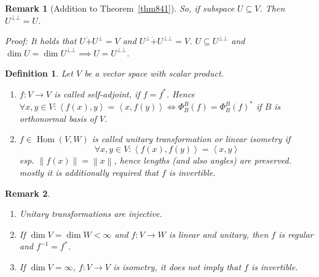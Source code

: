 \documentclass{article}
\newtheorem{definition}{Definition}  \numberwithin{definition}{section}
\newtheorem{remark}{Remark}  \numberwithin{remark}{section}
\newcommand{\ip}[2]{\left\langle#1,#2\right\rangle} %
\newcommand{\norm}[1]{\left\|#1\right\|}
\DeclareMathOperator{\Hom}{Hom}
\begin{document}
\begin{remark}[Addition to Theorem~\ref{thm841}]
  So, if subspace $U \subseteq V$. Then $U^{\bot\bot} = U$.

  Proof: It holds that $U \dot{+} U^\bot = V$ and $U^\bot \dot{+} U^{\bot\bot} = V$.
  $U \subseteq U^{\bot\bot}$ and $\dim{U} = \dim{U}^{\bot\bot} \implies U = U^{\bot\bot}$.
\end{remark}

\begin{definition} %
  Let $V$ be a vector space with scalar product.
  \begin{enumerate}
    \item $f: V \to V$ is called \emph{self-adjoint}, if $f = f^*$.
      Hence $\forall x, y \in V: \ip{f(x)}{y} = \ip{x}{f(y)} \iff \Phi_B^B(f) = \Phi_B^B(f)^*$
      if $B$ is orthonormal basis of $V$.
    \item
      $f \in \Hom(V,W)$ is called \emph{unitary transformation} or \emph{linear isometry} if
      \[ \forall x,y \in V: \ip{f(x)}{f(y)} = \ip{x}{y} \]
      esp. $\norm{f(x)} = \norm{x}$, hence lengths (and also angles) are preserved. \\
      \emph{mostly} it is additionally required that $f$ is invertible.
  \end{enumerate}
\end{definition}

\begin{remark} %
  \label{bem868}
  \begin{enumerate}
    \item Unitary transformations are injective.
    \item If $\dim{V} = \dim{W} < \infty$ and $f: V \to W$ is linear and unitary,
    then $f$ is regular and $f^{-1} = f^*$.
    \item If $\dim{V} = \infty$, $f: V \to V$ is isometry, it does not imply that $f$ is invertible.
  \end{enumerate}
\end{remark}
\end{document}
